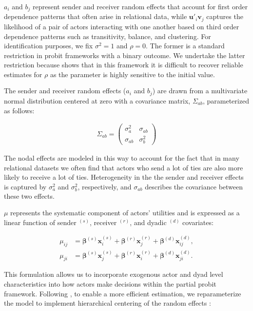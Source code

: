 \documentclass[a4paper, 12pt]{article}
\begin{document}
$a_{i}$ and $b_{j}$ represent sender and receiver random effects that account for first order dependence patterns that often arise in relational data, while $\bm{u}'_i\bm{v}_j$ captures the likelihood of a pair of actors interacting with one another based on third order dependence patterns such as transitivity, balance, and clustering. For identification purposes, we fix $\sigma^2=1$ and $\rho=0$. The former is a standard restriction in probit frameworks with a binary outcome. We undertake the latter restriction because \citet{rajbhandari:2014} shows that in this framework it is difficult to recover reliable estimates for $\rho$ as the parameter is highly sensitive to the initial value. 

The sender and receiver random effects ($a_{i}$ and $b_{j}$) are drawn from a multivariate normal distribution centered at zero with a covariance matrix, $\Sigma_{ab}$, parameterized as follows:

\begin{align}
  \Sigma_{ab} = \begin{pmatrix} \sigma_{a}^{2} & \sigma_{ab} \\ \sigma_{ab} & \sigma_{b}^2   \end{pmatrix}
\end{align}

The nodal effects are modeled in this way to account for the fact that in many relational datasets we often find that actors who send a lot of ties are also more likely to receive a lot of ties. Heterogeneity in the the sender and receiver effects is captured by $\sigma_{a}^{2}$ and $\sigma_{b}^{2}$, respectively, and $\sigma_{ab}$ describes the covariance between these two effects. 

$\mu$ represents the systematic component of actors' utilities and is expressed as a linear function of sender $^{(s)}$, receiver $^{(r)}$, and dyadic $^{(d)}$ covariates: 

\begin{align}
    \mu_{ij} & = \bm{\beta}^{(s)}\bm{x}_i^{(s)} + \bm{\beta}^{(r)}\bm{x}_j^{(r)} + \bm{\beta}^{(d)}\bm{x}_{ij}^{(d)}, \label{eq:itoj}\\
    \mu_{ji} & = \bm{\beta}^{(s)}\bm{x}_j^{(s)} + \bm{\beta}^{(r)}\bm{x}_i^{(r)} + \bm{\beta}^{(d)}\bm{x}_{ji}^{(d)} \label{eq:jtoi}.
\end{align}

This formulation allows us to incorporate exogenous actor and dyad level characteristics into how actors make decisions within the partial probit framework. Following \citet{hoff:2005}, to enable a more efficient estimation, we reparameterize the model to implement hierarchical centering of the random effects \citep{gelfand:etal:1995}:
\end{document}
